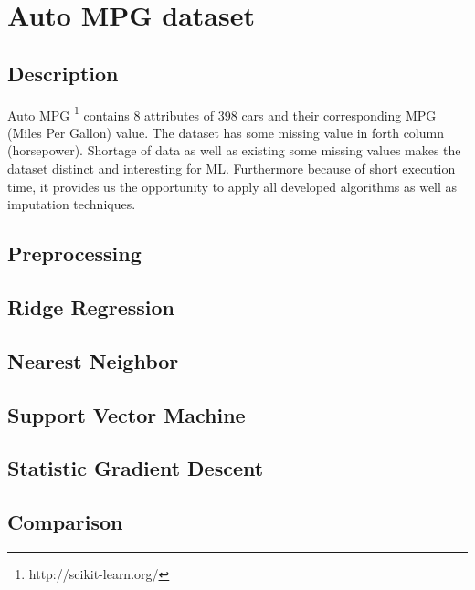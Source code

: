 \section{Auto MPG dataset}
\subsection{Description}
Auto MPG \footnote{http://scikit-learn.org/} contains 8 attributes of 398 cars  and their corresponding MPG (Miles Per Gallon) value. The dataset has some missing value in forth column (horsepower). Shortage of data as well as existing some missing values makes the dataset distinct and interesting for ML. Furthermore because of short execution time, it provides us the opportunity to apply all developed algorithms as well as imputation techniques.

\subsection{Preprocessing}

\subsection{Ridge Regression}
\subsection{Nearest Neighbor}
\subsection{Support Vector Machine}
\subsection{Statistic Gradient Descent}
\subsection{Comparison}

